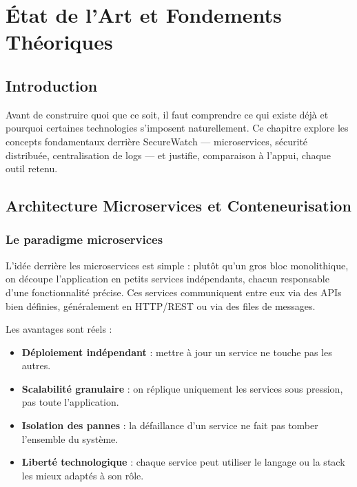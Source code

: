 \documentclass[12pt, a4paper]{report}
\begin{document}
\chapter{État de l'Art et Fondements Théoriques}

\section{Introduction}

Avant de construire quoi que ce soit, il faut comprendre ce qui existe déjà et pourquoi certaines technologies s'imposent naturellement. Ce chapitre explore les concepts fondamentaux derrière SecureWatch — microservices, sécurité distribuée, centralisation de logs — et justifie, comparaison à l'appui, chaque outil retenu.

\section{Architecture Microservices et Conteneurisation}

\subsection{Le paradigme microservices}

L'idée derrière les microservices est simple : plutôt qu'un gros bloc monolithique, on découpe l'application en petits services indépendants, chacun responsable d'une fonctionnalité précise. Ces services communiquent entre eux via des APIs bien définies, généralement en HTTP/REST ou via des files de messages.

Les avantages sont réels :
\begin{itemize}[leftmargin=*]
  \item \textbf{Déploiement indépendant} : mettre à jour un service ne touche pas les autres.
  \item \textbf{Scalabilité granulaire} : on réplique uniquement les services sous pression, pas toute l'application.
  \item \textbf{Isolation des pannes} : la défaillance d'un service ne fait pas tomber l'ensemble du système.
  \item \textbf{Liberté technologique} : chaque service peut utiliser le langage ou la stack les mieux adaptés à son rôle.
\end{itemize}
\end{document}
